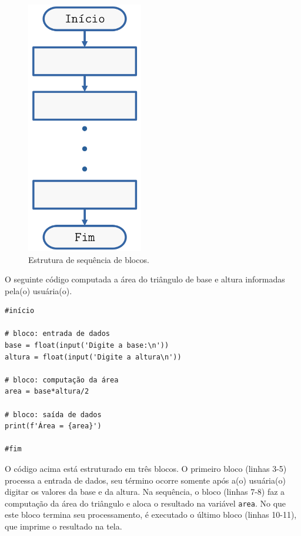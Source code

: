 \begin{figure}[H]
  \centering
  \includegraphics[width=2in]{./cap_progest/dados/fig_fg_sequencia/fig.png}
  \caption{Estrutura de sequência de blocos.}
  \label{cap_progest:fig:fg_sequencia}
\end{figure}

\begin{ex}
  O seguinte código computada a área do triângulo de base e altura informadas pela(o) usuária(o).

\begin{lstlisting}
#início

# bloco: entrada de dados
base = float(input('Digite a base:\n'))
altura = float(input('Digite a altura\n'))

# bloco: computação da área
area = base*altura/2

# bloco: saída de dados
print(f'Área = {area}')

#fim
\end{lstlisting}

O código acima está estruturado em três blocos. O primeiro bloco (linhas 3-5) processa a entrada de dados, seu término ocorre somente após a(o) usuária(o) digitar os valores da base e da altura. Na sequência, o bloco (linhas 7-8) faz a computação da área do triângulo e aloca o resultado na variável \lstinline+area+. No que este bloco termina seu processamento, é executado o último bloco (linhas 10-11), que imprime o resultado na tela.
\end{ex}

